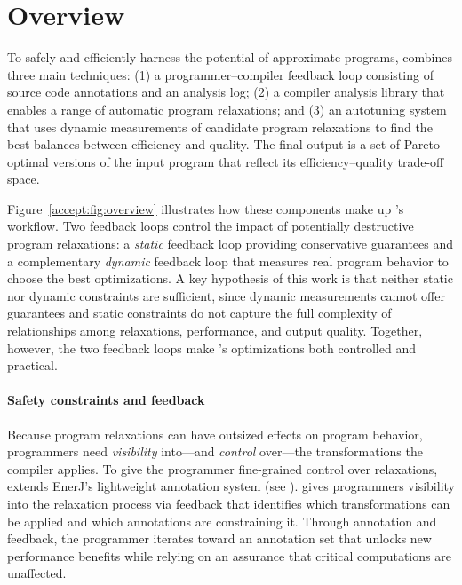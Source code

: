 \section{Overview}


To safely and efficiently harness the potential of approximate programs,
\sysname combines three main techniques: (1) a programmer--compiler
feedback loop consisting of source code annotations and an analysis log; (2) a
compiler analysis library
that enables a range of automatic program relaxations; and (3) an autotuning
system that uses dynamic measurements of candidate program relaxations to find
the best balances between efficiency and quality. The final output is a set of
Pareto-optimal versions of the input program that reflect its
efficiency--quality trade-off space.

Figure~\ref{accept:fig:overview} illustrates
how these components make up \sysname's workflow.
Two feedback loops control the impact of
potentially destructive program relaxations: a \emph{static} feedback loop
providing
conservative guarantees
and a complementary \emph{dynamic} feedback loop that measures real
program behavior to choose the best optimizations.
%
A key hypothesis of this work is that neither static nor dynamic constraints
are sufficient, since dynamic measurements cannot offer guarantees and static
constraints do not capture the full complexity of relationships among
relaxations, performance, and output quality. Together, however, the two
feedback loops make \sysname's optimizations both controlled and practical.
%

\paragraph{Safety constraints and feedback}
Because program relaxations can have outsized effects on program behavior,
programmers need \emph{visibility} into---and \emph{control} over---the
transformations the compiler applies.
%
To give the programmer fine-grained control over relaxations, \sysname extends
EnerJ's lightweight annotation system (see ).
%
\sysname gives programmers visibility into the relaxation process via feedback
that identifies which transformations can be applied and which annotations are
constraining it.  Through annotation and feedback, the programmer iterates
toward an annotation set that unlocks new performance benefits while relying on
an assurance that critical computations are unaffected.

